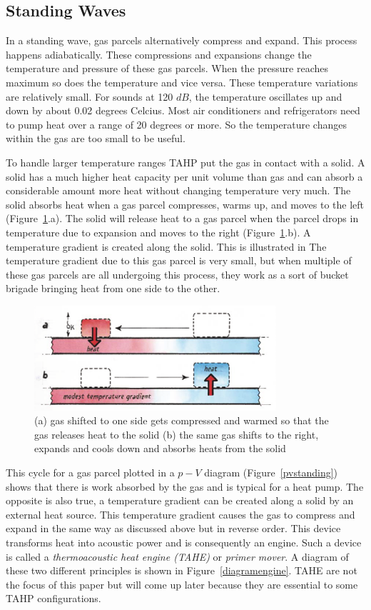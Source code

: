 \documentclass[a4paper]{article}
\newcommand{\newpara}
    {
      \bigbreak{}
      \noindent
    }
\begin{document}
\subsection{Standing Waves\cite{powerofsound,enginesandrefrigerators,tijaniLoudSpeaker}}
In a standing wave, gas parcels alternatively compress and expand. This process happens adiabatically. These compressions and expansions change the temperature and pressure of these gas parcels. When the pressure reaches maximum so does the temperature and vice versa. These temperature variations are relatively small. For sounds at 120 \(dB\), the temperature oscillates up and down by about 0.02 degrees Celcius. Most air conditioners and refrigerators need to pump heat over a range of 20 degrees or more. So the temperature changes within the gas are too small to be useful.
\newpara{}
To handle larger temperature ranges TAHP put the gas in contact with a solid. A solid has a much higher heat capacity per unit volume than gas and can absorb a considerable amount more heat without changing temperature very much. The solid absorbs heat when a gas parcel compresses, warms up, and moves to the left (Figure~\ref{gascycle}.a). The solid will release heat to a gas parcel when the parcel drops in temperature due to expansion and moves to the right (Figure~\ref{gascycle}.b). A temperature gradient is created along the solid. This is illustrated in  The temperature gradient due to this gas parcel is very small, but when multiple of these gas parcels are all undergoing this process, they work as a sort of bucket brigade bringing heat from one side to the other. %
\begin{figure}[ht]
  \centering
  \includegraphics[width=0.8\textwidth]{images/powerofsound/gascycle.png}
  \caption{(a) gas shifted to one side gets compressed and warmed so that the gas releases heat to the solid (b) the same gas shifts to the right, expands and cools down and absorbs heats from the solid\cite{powerofsound}}\label{gascycle}
\end{figure}
\newpara{}
This cycle for a gas parcel plotted in a \(p-V\) diagram (Figure~\ref{pvstanding}) shows that there is work absorbed by the gas and is typical for a heat pump. The opposite is also true, a temperature gradient can be created along a solid by an external heat source. This temperature gradient causes the gas to compress and expand in the same way as discussed above but in reverse order. This device transforms heat into acoustic power and is consequently an engine. Such a device is called a \emph{thermoacoustic heat engine (TAHE)} or \emph{primer mover}. A diagram of these two different principles is shown in Figure~\ref{diagramengine}. TAHE are not the focus of this paper but will come up later because they are essential to some TAHP configurations.
\end{document}
